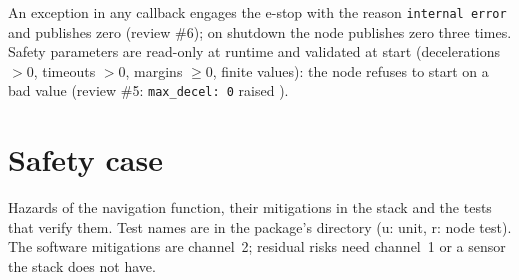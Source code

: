 An exception in any callback engages the e-stop with the reason \texttt{internal error} and
publishes zero (review \#6); on shutdown the node publishes zero three times. Safety parameters
are read-only at runtime and validated at start (decelerations $> 0$, timeouts $> 0$, margins
$\ge 0$, finite values): the node refuses to start on a bad value (review \#5:
\texttt{max\_decel: 0} raised ).

\section{Safety case}
\label{sec:safety-case}

Hazards of the navigation function, their mitigations in the stack and the tests that verify
them. Test names are  in the package's  directory (u: unit, r:
node test). The software mitigations are channel~2; residual risks need channel~1 or a sensor
the stack does not have.

